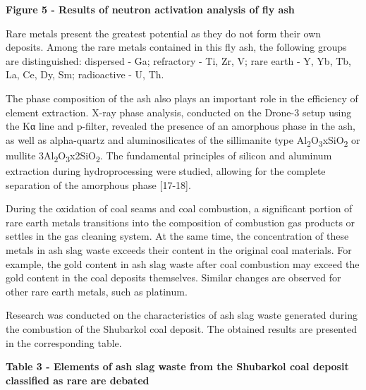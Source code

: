 \textbf{Figure 5 - Results of neutron activation analysis of fly ash}

Rare metals present the greatest potential as they do not form their own
deposits. Among the rare metals contained in this fly ash, the following
groups are distinguished: dispersed - Ga; refractory - Ti, Zr, V; rare
earth - Y, Yb, Tb, La, Ce, Dy, Sm; radioactive - U, Th.

The phase composition of the ash also plays an important role in the
efficiency of element extraction. X-ray phase analysis, conducted on the
Drone-3 setup using the Kα line and p-filter, revealed the presence of
an amorphous phase in the ash, as well as alpha-quartz and
aluminosilicates of the sillimanite type
Al\textsubscript{2}O\textsubscript{3}xSiO\textsubscript{2} or mullite
3Al\textsubscript{2}O\textsubscript{3}x2SiO\textsubscript{2}. The
fundamental principles of silicon and aluminum extraction during
hydroprocessing were studied, allowing for the complete separation of
the amorphous phase {[}17-18{]}.

During the oxidation of coal seams and coal combustion, a significant
portion of rare earth metals transitions into the composition of
combustion gas products or settles in the gas cleaning system. At the
same time, the concentration of these metals in ash slag waste exceeds
their content in the original coal materials. For example, the gold
content in ash slag waste after coal combustion may exceed the gold
content in the coal deposits themselves. Similar changes are observed
for other rare earth metals, such as platinum.

Research was conducted on the characteristics of ash slag waste
generated during the combustion of the Shubarkol coal deposit. The
obtained results are presented in the corresponding table.

\textbf{Table 3 - Elements of ash slag waste from the Shubarkol coal
deposit classified as rare are debated}

